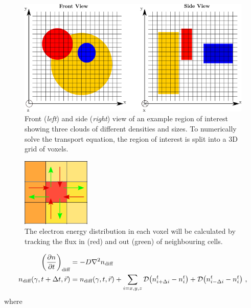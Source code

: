 \begin{figure}[h!]
	\centering
	\includegraphics[width=\textwidth]{09_Multizone/Images/code/cartesian.png}
	\caption{Front (\textit{left}) and side (\textit{right}) view of an example region of interest showing three clouds of different densities and sizes. To numerically solve the transport equation, the region of interest is split into a 3D grid of voxels.}
	\label{fig:chapter_8_multizone_cartesian}
\end{figure}
\begin{figure}
	\centering
	\includegraphics[width=0.29\textwidth]{09_Multizone/Images/code/transport.png}
	\caption{The electron energy distribution in each voxel will be calculated by tracking the flux in (red) and out (green) of neighbouring cells.}
	\label{eq:09_transport_cells}
\end{figure}
\begin{equation}
    \begin{aligned}
        \qty(\pdv{n}{t})_\text{diff}
        &= -D\nabla^2 n_\text{diff} \\
        n_\text{diff}\qty(\gamma,t+\Delta t,\vec{r})&=n_\text{diff}\qty(\gamma,t,\vec{r})+\sum_{i=x,y,z} \mathcal{D}
        \qty(n_{i+\Delta i}^{t}
        -n_{i}^t)
        +\mathcal{D}
        \qty(n_{i-\Delta i}^t
        -n_i^t) \text{ ,} 
    \end{aligned} \label{eq:chapter_8_multizone_diff_numerical_sol}
\end{equation}
\noindent where
